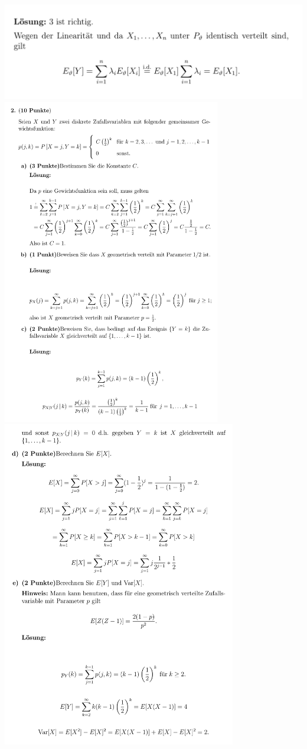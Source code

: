 \includegraphics[width=0.8\linewidth]{old_exams_prtsrc/tei_infk_so17_ml-07.png}\newline
\includegraphics[height=143mm]{old_exams_prtsrc/tei_infk_so17_ml-08.png}\newline
\includegraphics[height=143mm]{old_exams_prtsrc/tei_infk_so17_ml-09.png}\newline
